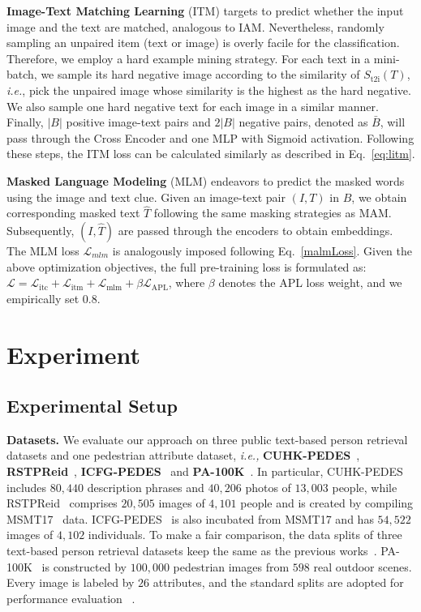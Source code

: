 \documentclass[sigconf]{acmart}
\def\ie{\emph{i.e.}}
\begin{document}
\noindent
\textbf{Image-Text Matching Learning}
(ITM) targets to predict whether the input image and the text are matched, analogous to IAM.
Nevertheless, randomly sampling an unpaired item (text or image) is overly facile for the classification. Therefore, we employ a hard example mining strategy.
For each text in a mini-batch, we sample its hard negative image according to the similarity of $S_{\text{t2i}}(T)$, \ie, pick the unpaired image whose similarity is the highest as the hard negative. 
We also sample one hard negative text for each image in a similar manner. 
Finally, $|B|$ positive image-text pairs and $2|B|$ negative pairs, denoted as $\bar{B}$, will pass through the Cross Encoder and one MLP with Sigmoid activation. Following these steps, the ITM loss can be calculated similarly as described in Eq.~\ref{eq:litm}.


\noindent\textbf{Masked Language Modeling}
(MLM) endeavors to predict the masked words using the image and text clue. 
Given an image-text pair $(I, T)$ in $B$, we obtain corresponding masked text $\hat{T}$ following the same masking strategies as MAM. Subsequently, $(I, \hat{T})$ are passed through the encoders to obtain embeddings. The MLM loss $\mathcal{L}_{mlm}$ is analogously imposed following Eq.~\ref{malmLoss}.
Given the above optimization objectives, the full pre-training loss is formulated as:
$\mathcal{L} = \mathcal{L}_{\text{itc}} + \mathcal{L}_{\text{itm}} + \mathcal{L}_{\text{mlm}} + \mathcal \beta \mathcal{L}_{\text{APL}}$,
where $\beta$ denotes the APL loss weight, and we empirically set $0.8$.


\section{Experiment}


\subsection{Experimental Setup}


\textbf{Datasets.} 
We evaluate our approach on three public text-based person retrieval datasets and one  pedestrian attribute dataset,
\emph{i.e.,} \textbf{CUHK-PEDES}~\cite{li2017person},  \textbf{RSTPReid}~\cite{zhu2021dssl}, \textbf{ICFG-PEDES}~\cite{ding2021semantically} and \textbf{PA-100K}~\cite{liu2017hydraplus}. 
In particular, CUHK-PEDES~\cite{li2017person} includes $80,440$ description phrases and $40,206$ photos of $13,003$ people, while RSTPReid~\cite{zhu2021dssl} comprises $20,505$ images of $4,101$ people and is created by compiling MSMT17~\cite{wei2018person} data. 
ICFG-PEDES~\cite{ding2021semantically} is also incubated from MSMT17 and has $54,522$ images of $4,102$ individuals. 
To make a fair comparison, the data splits of three text-based person retrieval datasets keep the same as the previous works~\cite{yan2022clip,farooq2022axm}.
PA-100K~\cite{liu2017hydraplus} is constructed by $100,000$ pedestrian images from $598$ real outdoor scenes.
Every image is labeled by $26$ attributes, and the standard splits are adopted for performance evaluation ~\cite{liu2017hydraplus}.
\end{document}
